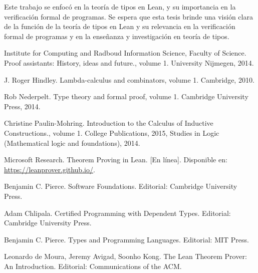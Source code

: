 \documentclass{article}
\begin{document}
Este trabajo se enfocó en la teoría de tipos en Lean, y su importancia en
la verificación formal de programas. Se espera que esta tesis brinde una
visión clara de la función de la teoría de tipos en Lean y su relevancia
en la verificación formal de programas y en la enseñanza y investigación
en teoría de tipos.
\begin{thebibliography}{9}

	 Institute for Computing and Radboud Information Science, Faculty of Science.
	Proof assistants: History, ideas and future., volume 1. University Nijmegen, 2014.

	 J. Roger Hindley. Lambda-calculus and combinators, volume 1. Cambridge, 2010.

	 Rob  Nederpelt. Type theory and formal proof, volume 1. Cambridge University
	Press, 2014.

	 Christine Paulin-Mohring. Introduction to the Calculus of Inductive Constructions., volume 1. College Publications, 2015, Studies in Logic (Mathematical
	logic and foundations), 2014.

	Microsoft Research.
	Theorem Proving in Lean.
		[En línea]. Disponible en: \url{https://leanprover.github.io/}.

	Benjamin C. Pierce.
	Software Foundations.
	Editorial: Cambridge University Press.

	Adam Chlipala.
	Certified Programming with Dependent Types.
	Editorial: Cambridge University Press.

	Benjamin C. Pierce.
	Types and Programming Languages.
	Editorial: MIT Press.

	Leonardo de Moura, Jeremy Avigad, Soonho Kong.
	The Lean Theorem Prover: An Introduction.
	Editorial: Communications of the ACM.

\end{thebibliography}
\end{document}
